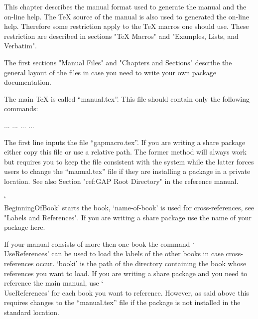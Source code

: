 

This  chapter describes  the  manual format  used to generate  the {\GAP}
manual and the on-line help. The {\TeX} source of the manual is also used
to generated the  on-line help. Therefore some  restriction  apply to the
{\TeX} macros one should use. These restriction are described in sections
"TeX Macros" and "Examples, Lists, and Verbatim".

The first sections "Manual  Files"  and "Chapters and Sections"  describe
the  general  layout of the  files  in case  you need to   write your own
package documentation.


The main {\TeX} is called  ``manual.tex''.  This file should contain only
the following commands:

\begintt
  
    ...
    \TableOfContents
    \FrontMatter
      ...
    \Chapters
      ...
    \Appendices
      ...
      \Answers
      \Bibliography
      \Index
  \EndOfBook
\endtt

The first  line inputs the  file ``gapmacro.tex''.  If  you are writing a
share package  either copy this file or use a  relative path.  The former
method will always work but requires you to keep the file consistent with
the  system while  the latter  forces users to  change the ``manual.tex''
file  if they are installing  a package in  a private location.  See also
Section "ref:GAP Root Directory" in the reference manual.

`\\BeginningOfBook' starts   the   book, `name-of-book'   is  used    for
cross-references,  see "Labels  and References".   If  you are  writing a
share package use the name of your package here.

If   your manual   consists   of more    then    one book  the    command
`\\UseReferences' can  be used to  load the labels  of the other books in
case  cross-references  occur.  `booki'  is  the  path  of the  directory
containing  the book  whose  references you want  to   load.  If you  are
writing a share package and you need to reference the main {\GAP} manual,
use  `\\UseReferences' for each book  you want to reference.  However, as
said  above  this requires  changes to   the ``manual.tex'' file   if the
package is not installed in the standard location.

